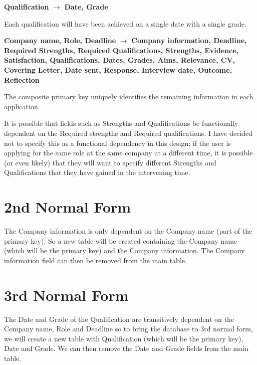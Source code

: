 \documentclass[a4paper, twoside]{article}
\begin{document}
\begin{center}
  \textbf{Qualification} $\rightarrow$ \textbf{Date, Grade}
\end{center}
Each qualification will have been achieved on a single date with a single grade.

\begin{center}
  \textbf{Company name, Role, Deadline} $\rightarrow$ \textbf{Company
    information, Deadline, Required Strengths, Required Qualifications,
    Strengths, Evidence, Satisfaction, Qualifications, Dates, Grades, Aims,
    Relevance, CV, Covering Letter, Date sent, Response, Interview date,
  Outcome, Reflection}
\end{center}
The composite primary key uniquely identifies the remaining information in each
application.

It is possible that fields such as Strengths and Qualifications be
functionally dependent on the Required strengths and Required qualifications. I
have decided not to specify this as a functional dependency in this design; if
the user is applying for the same role at the same company at a different time,
it is possible (or even likely) that they will want to specify different
Strengths and Qualifications that they have gained in the intervening time.

\section{2nd Normal Form}
The Company information is only dependent on the Company name (part of the
primary key). So a new table will be created containing the Company name (which
will be the primary key) and the Company information. The Company information
field can then be removed from the main table.

\section{3rd Normal Form}
The Date and Grade of the Qualification are transitively dependent on the
Company name, Role and Deadline so to bring the database to 3rd normal form, we
will create a new table with Qualification (which will be the primary key), Date
and Grade. We can then remove the Date and Grade fields from the main table.
\end{document}
